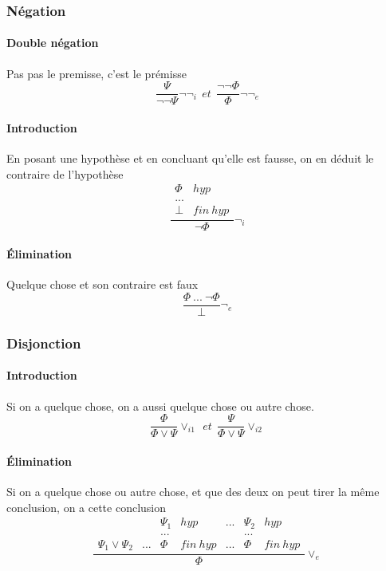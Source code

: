 \documentclass[a4paper]{article}
\begin{document}
  \subsubsection{Négation}
  \paragraph{Double négation} Pas pas le premisse, c'est le prémisse
  $$\frac{\Psi}{\lnot\lnot\Psi}\lnot\lnot_{i} ~~ et ~~ \frac{\lnot\lnot\Phi}{\Phi}\lnot\lnot_{e}$$

  \paragraph{Introduction} En posant une hypothèse et en concluant qu'elle est fausse, on en déduit le contraire de l'hypothèse
  $$ \frac{\begin{matrix} \Phi & hyp\\
     ... & \\
     \bot & fin ~ hyp\end{matrix}}{\lnot \Phi}\lnot_{i} $$

  \paragraph{\'Elimination} Quelque chose et son contraire est faux
  $$\frac{\Phi~...~\lnot\Phi}{\bot}\lnot_{e}$$

  \subsubsection{Disjonction}
  \paragraph{Introduction} Si on a quelque chose, on a aussi quelque chose ou autre chose.
  $$\frac{\Phi}{\Phi \lor \Psi}\lor_{i1} ~~ et ~~ \frac{\Psi}{\Phi \lor \Psi}\lor_{i2}$$

  \paragraph{\'Elimination} Si on a quelque chose ou autre chose, et que des deux
  on peut tirer la même conclusion, on a cette conclusion
  $$ \frac{\begin{matrix} &  & \Psi_{1} & hyp & ... & \Psi_{2} & hyp\\
      & & ... & & & ... & \\
     \Psi_{1}\lor\Psi_{2} & ... & \Phi & fin ~ hyp & ... & \Phi & fin ~ hyp\end{matrix}}{\Phi}\lor_{e} $$
\end{document}
